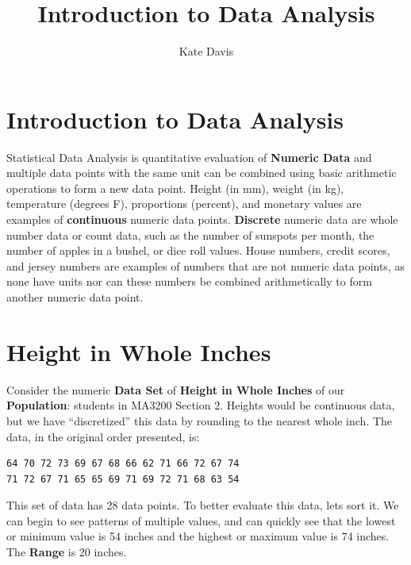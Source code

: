 \documentclass[nohyper,justified]{tufte-handout}\usepackage[]{graphicx}\usepackage[]{color}
\title{Introduction to Data Analysis}
\author{Kate Davis}
\makeatletter
\newenvironment{kframe}{%
 \def\at@end@of@kframe{}%
 \ifinner\ifhmode%
  \def\at@end@of@kframe{\end{minipage}}%
  \begin{minipage}{\columnwidth}%
 \fi\fi%
 \def\FrameCommand##1{\hskip\@totalleftmargin \hskip-\fboxsep
 \colorbox{shadecolor}{##1}\hskip-\fboxsep
     \hskip-\linewidth \hskip-\@totalleftmargin \hskip\columnwidth}%
 \MakeFramed {\advance\hsize-\width
   \@totalleftmargin\z@ \linewidth\hsize
   \@setminipage}}%
 {\par\unskip\endMakeFramed%
 \at@end@of@kframe}
\newenvironment{knitrout}{}{} %
\makeatother
\begin{document}
\maketitle
\section{Introduction to Data Analysis}
Statistical Data Analysis is quantitative evaluation of \textbf{Numeric Data} and multiple data points with the same unit can be combined using basic arithmetic operations to form a new data point. Height (in mm), weight (in kg), temperature (degrees F), proportions (percent), and monetary values are examples of  \textbf{continuous} numeric data points. \textbf{Discrete} numeric data are whole number data or count data, such as the number of sunspots per month, the number of apples in a bushel, or dice roll values.  House numbers, credit scores, and jersey numbers are examples of numbers that are not numeric data points, as none have units nor can these numbers be combined arithmetically to form another numeric data point.

\section{Height in Whole Inches}
Consider the numeric \textbf{Data Set} of \textbf{Height in Whole Inches} of our \textbf{Population}: students in MA3200 Section 2. Heights would be continuous data, but we have ``discretized'' this data by rounding to the nearest whole inch. The data, in the original order presented, is:

\begin{knitrout}
\color{fgcolor}\begin{kframe}
\begin{verbatim}
64 70 72 73 69 67 68 66 62 71 66 72 67 74
71 72 67 71 65 65 69 71 69 72 71 68 63 54
\end{verbatim}
\end{kframe}
\end{knitrout}
This set of data has 28 data points. To better evaluate this data, lets sort it. We can begin to see patterns of multiple values, and can quickly see that the lowest or minimum value is 54 inches and the highest or maximum value is 74 inches. The \textbf{Range} is 20 inches.
\end{document}
